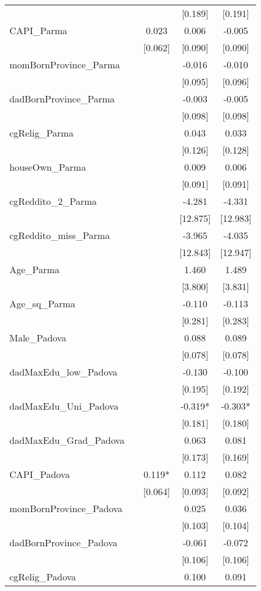 \documentclass[]{article}
\begin{document}
\begin{tabular}{lcccc}
 &  &  & [0.189] & [0.191] \\
CAPI\_Parma &  & 0.023 & 0.006 & -0.005 \\
 &  & [0.062] & [0.090] & [0.090] \\
momBornProvince\_Parma &  &  & -0.016 & -0.010 \\
 &  &  & [0.095] & [0.096] \\
dadBornProvince\_Parma &  &  & -0.003 & -0.005 \\
 &  &  & [0.098] & [0.098] \\
cgRelig\_Parma &  &  & 0.043 & 0.033 \\
 &  &  & [0.126] & [0.128] \\
houseOwn\_Parma &  &  & 0.009 & 0.006 \\
 &  &  & [0.091] & [0.091] \\
cgReddito\_2\_Parma &  &  & -4.281 & -4.331 \\
 &  &  & [12.875] & [12.983] \\
cgReddito\_miss\_Parma &  &  & -3.965 & -4.035 \\
 &  &  & [12.843] & [12.947] \\
Age\_Parma &  &  & 1.460 & 1.489 \\
 &  &  & [3.800] & [3.831] \\
Age\_sq\_Parma &  &  & -0.110 & -0.113 \\
 &  &  & [0.281] & [0.283] \\
Male\_Padova &  &  & 0.088 & 0.089 \\
 &  &  & [0.078] & [0.078] \\
dadMaxEdu\_low\_Padova &  &  & -0.130 & -0.100 \\
 &  &  & [0.195] & [0.192] \\
dadMaxEdu\_Uni\_Padova &  &  & -0.319* & -0.303* \\
 &  &  & [0.181] & [0.180] \\
dadMaxEdu\_Grad\_Padova &  &  & 0.063 & 0.081 \\
 &  &  & [0.173] & [0.169] \\
CAPI\_Padova &  & 0.119* & 0.112 & 0.082 \\
 &  & [0.064] & [0.093] & [0.092] \\
momBornProvince\_Padova &  &  & 0.025 & 0.036 \\
 &  &  & [0.103] & [0.104] \\
dadBornProvince\_Padova &  &  & -0.061 & -0.072 \\
 &  &  & [0.106] & [0.106] \\
cgRelig\_Padova &  &  & 0.100 & 0.091 \\

\end{tabular}
\end{document}
